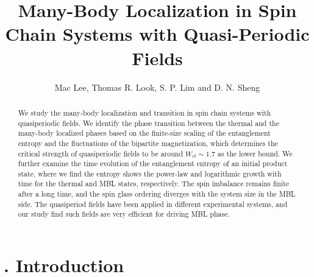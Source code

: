 \documentclass[prl,aps,epsf,showpacs,twocolumn,letterpaper]{revtex4}
\let\oldsection\section
\renewcommand{\section}[1]{\stepcounter{section}\oldsection{\Roman{section}. #1}}
\begin{document}
\title{Many-Body Localization in  Spin Chain Systems with  Quasi-Periodic Fields}
\author{Mac Lee, Thomas R. Look, S. P. Lim and D. N. Sheng}



\begin{abstract} 
We study the many-body localization and transition in spin chain systems with  quasiperiodic  fields.
We identify the phase transition between the thermal and the many-body localized phases based on the finite-size
scaling of the entanglement entropy and the 
 fluctuations of the bipartite magnetization, which determines the  critical
strength of quasiperiodic fields to be around $W_{cl}\sim 1.7$ as the lower bound.  We further examine  the time evolution of the entanglement entropy of an initial product state,
where we find the entropy  shows  the power-law and logarithmic growth with time for the  thermal and MBL states, respectively.
The spin imbalance remains finite after  a long time, and  the spin glass ordering diverges with the system size in the MBL side.
 The quasiperiod fields  have been applied in different experimental systems, and our study
find such fields are  very efficient for driving  MBL phase.
\end{abstract}

\maketitle


\section{Introduction}
\end{document}
